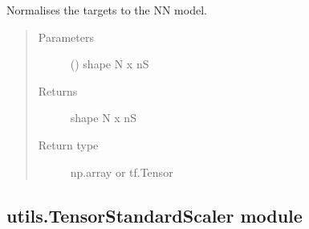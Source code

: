 \documentclass[letterpaper,10pt,english,openany,oneside]{sphinxmanual}
\begin{document}
\begin{fulllineitems}
\begin{fulllineitems}
\label{\detokenize{_modules/utils:utils.ModelScaler.ModelScaler.transformTarget}}
Normalises the targets to the NN model.
\begin{quote}\begin{description}
\item[{Parameters}] \leavevmode
{} () \textendash{} shape N x nS

\item[{Returns}] \leavevmode
shape N x nS

\item[{Return type}] \leavevmode
np.array or tf.Tensor

\end{description}\end{quote}

\end{fulllineitems}


\end{fulllineitems}



\subsection{utils.TensorStandardScaler module}
\label{\detokenize{_modules/utils:module-utils.TensorStandardScaler}}\label{\detokenize{_modules/utils:utils-tensorstandardscaler-module}}
\end{document}
